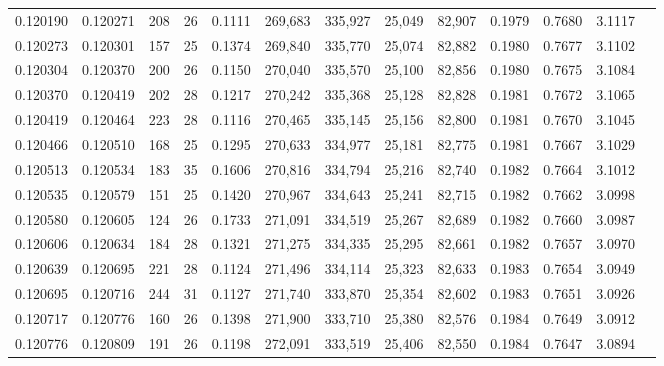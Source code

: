 \begin{tabular}{rrrrrrrrrrrrr}
0.120190 & 0.120271 & 208 &  26 &                                     0.1111 & 269,683 & 335,927 &  25,049 &  82,907 & 0.1979 & 0.7680 & 3.1117 \\
0.120273 & 0.120301 & 157 &  25 &                                     0.1374 & 269,840 & 335,770 &  25,074 &  82,882 & 0.1980 & 0.7677 & 3.1102 \\
0.120304 & 0.120370 & 200 &  26 &                                     0.1150 & 270,040 & 335,570 &  25,100 &  82,856 & 0.1980 & 0.7675 & 3.1084 \\
0.120370 & 0.120419 & 202 &  28 &                                     0.1217 & 270,242 & 335,368 &  25,128 &  82,828 & 0.1981 & 0.7672 & 3.1065 \\
0.120419 & 0.120464 & 223 &  28 &                                     0.1116 & 270,465 & 335,145 &  25,156 &  82,800 & 0.1981 & 0.7670 & 3.1045 \\
0.120466 & 0.120510 & 168 &  25 &                                     0.1295 & 270,633 & 334,977 &  25,181 &  82,775 & 0.1981 & 0.7667 & 3.1029 \\
0.120513 & 0.120534 & 183 &  35 &                                     0.1606 & 270,816 & 334,794 &  25,216 &  82,740 & 0.1982 & 0.7664 & 3.1012 \\
0.120535 & 0.120579 & 151 &  25 &                                     0.1420 & 270,967 & 334,643 &  25,241 &  82,715 & 0.1982 & 0.7662 & 3.0998 \\
0.120580 & 0.120605 & 124 &  26 &                                     0.1733 & 271,091 & 334,519 &  25,267 &  82,689 & 0.1982 & 0.7660 & 3.0987 \\
0.120606 & 0.120634 & 184 &  28 &                                     0.1321 & 271,275 & 334,335 &  25,295 &  82,661 & 0.1982 & 0.7657 & 3.0970 \\
0.120639 & 0.120695 & 221 &  28 &                                     0.1124 & 271,496 & 334,114 &  25,323 &  82,633 & 0.1983 & 0.7654 & 3.0949 \\
0.120695 & 0.120716 & 244 &  31 &                                     0.1127 & 271,740 & 333,870 &  25,354 &  82,602 & 0.1983 & 0.7651 & 3.0926 \\
0.120717 & 0.120776 & 160 &  26 &                                     0.1398 & 271,900 & 333,710 &  25,380 &  82,576 & 0.1984 & 0.7649 & 3.0912 \\
0.120776 & 0.120809 & 191 &  26 &                                     0.1198 & 272,091 & 333,519 &  25,406 &  82,550 & 0.1984 & 0.7647 & 3.0894 \\

\end{tabular}
